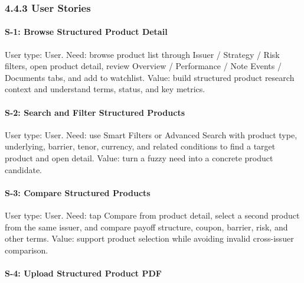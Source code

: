 \subsubsection{4.4.3 User Stories}

\paragraph{S-1: Browse Structured Product Detail}

User type: User. Need: browse product list through Issuer / Strategy / Risk filters, open product detail, review Overview / Performance / Note Events / Documents tabs, and add to watchlist. Value: build structured product research context and understand terms, status, and key metrics.


\paragraph{S-2: Search and Filter Structured Products}

User type: User. Need: use Smart Filters or Advanced Search with product type, underlying, barrier, tenor, currency, and related conditions to find a target product and open detail. Value: turn a fuzzy need into a concrete product candidate.


\paragraph{S-3: Compare Structured Products}

User type: User. Need: tap Compare from product detail, select a second product from the same issuer, and compare payoff structure, coupon, barrier, risk, and other terms. Value: support product selection while avoiding invalid cross-issuer comparison.


\paragraph{S-4: Upload Structured Product PDF}

